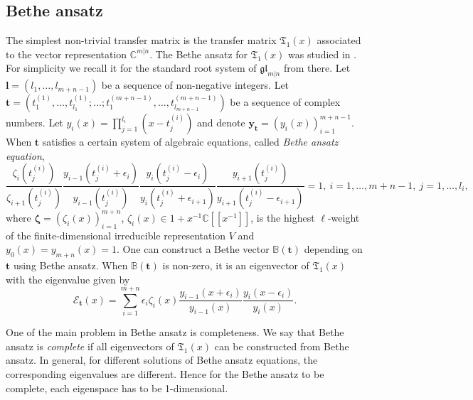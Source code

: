 \documentclass[11pt,reqno]{amsart}
\numberwithin{equation}{section}
\theoremstyle{definition}
\theoremstyle{remark}
\newcommand{\beq}{\begin{equation}}
\newcommand{\eeq}{\end{equation}}
\newcommand{\bs}{\boldsymbol}
\newcommand{\C}{\mathbb{C}}
\newcommand{\fkT}{\mathfrak{T}}
\newcommand{\glMN}{\mathfrak{gl}_{m|n}}
\begin{document}
\subsection{Bethe ansatz}\label{sec ba}
The simplest non-trivial transfer matrix is the transfer matrix $\fkT_1(x)$ associated to the vector representation $\C^{m|n}$. The Bethe ansatz for $\fkT_1(x)$ was studied in \cite{K:1985,BR:2008}. For simplicity we recall it for the standard root system of $\glMN$ from there. Let $\bs l=(l_1,\dots,l_{m+n-1})$ be a sequence of non-negative integers. Let $\bm{t}=(t_{1}^{(1)},\dots,t_{l_1}^{(1)};\dots;t_{1}^{(m+n-1)},\dots,t_{l_{m+n-1}}^{(m+n-1)})$ be a sequence of complex numbers. Let $y_i(x)=\prod_{j=1}^{l_i}(x-t_j^{(i)})$ and denote $\bm{y_t}=(y_i(x))_{i=1}^{m+n-1}$. When $\bm t$ satisfies a certain system of algebraic equations, called \emph{Bethe ansatz equation}, 
\beq\label{eq bae xxx}
\frac{\zeta_i(t_j^{(i)})}{\zeta_{i+1}(t_j^{(i)})}\frac{y_{i-1}(t_j^{(i)}+\epsilon_i)}{y_{i-1}(t_j^{(i)})}\frac{y_{i}(t_j^{(i)}-\epsilon_i)}{y_{i}(t_j^{(i)}+\epsilon_{i+1})}\frac{y_{i+1}(t_j^{(i)})}{y_{i+1}(t_j^{(i)}-\epsilon_{i+1})}=1,\ i=1,\dots,m+n-1,\ j=1,\dots,l_i,
\eeq
where $\bm\zeta=(\zeta_i(x))_{i=1}^{m+n}$, $\zeta_i(x)\in 1+x^{-1}\C[[x^{-1}]]$, is the highest $\ell$-weight of the finite-dimensional irreducible representation $V$ and $y_0(x)=y_{m+n}(x)=1$. One can construct a Bethe vector $\mathbb B(\bm t)$ depending on $\bm t$ using Bethe ansatz. When $\mathbb B(\bm t)$ is non-zero, it is an eigenvector of $\fkT_1(x)$ with the eigenvalue given by
\beq\label{eq eigenvalue}
\mathcal E_{\bm t}(x)=\sum_{i=1}^{m+n}\epsilon_i\zeta_i(x)\frac{y_{i-1}(x+\epsilon_i)}{y_{i-1}(x)}\frac{y_{i}(x-\epsilon_i)}{y_{i}(x)}.
\eeq

One of the main problem in Bethe ansatz is completeness. We say that Bethe ansatz is \textit{complete} if all eigenvectors of $\fkT_1(x)$ can be constructed from Bethe ansatz. In general, for different solutions of Bethe ansatz equations, the corresponding eigenvalues are different. Hence for the Bethe ansatz to be complete, each eigenspace has to be 1-dimensional.
\end{document}
